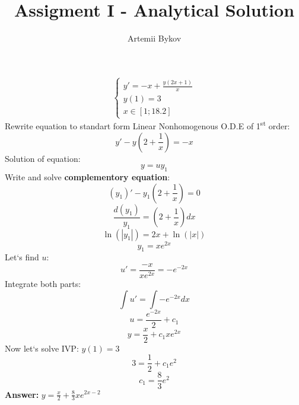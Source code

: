 \documentclass{article}
\title{Assigment I - Analytical Solution}
\author{Artemii Bykov }
\date{}
\begin{document}
    
    \maketitle
    \centering
    \thispagestyle{empty}

    \[
        \left\{
            \begin{array}{c}
            y'=-x + \frac{y(2x+1)}{x}  \\ 
            y(1)=3 \\
             x\in[1;18.2]
        \end{array}
        \right.
    \]
    Rewrite equation to standart form  Linear Nonhomogenous O.D.E of 1\textsuperscript{st} order: 
    \[y'-y(2+\frac{1}{x})=-x\]
    Solution of equation: \[y=uy_{1}\]
    Write and solve \textbf{complementory equation}:
    \[(y_{1})'-y_{1}(2+\frac{1}{x})=0 \]
    \[\frac{d(y_{1})}{y_{1}}=(2+\frac{1}{x})dx\]
    \[\ln(|y_{1}|)=2x+\ln(|x|)\]
    \[y_{1}=xe^{2x}\]
    Let`s find \ensuremath{u}:
    \[u' = \frac{-x}{xe^{2x}}=-e^{-2x}\]
    Integrate both parts:
    \[\int u'=\int -e^{-2x}dx\]
    \[u = \frac{e^{-2x}}{2}+c_1\]
    \[y=\frac{x}{2}+c_1xe^{2x}\]
    Now let`s solve IVP: \ensuremath{y(1)=3}
    \[3 = \frac{1}{2} + c_1e^2\]
    \[c_1 = \frac{8}{3}e^2\]
    \textbf{Answer:} \ensuremath{y = \frac{x}{2}+\frac{8}{3}xe^{2x-2}}
    

    
\end{document}
